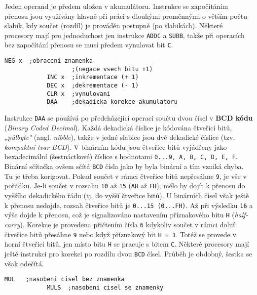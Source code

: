          Jeden operand je předem uložen v akumulátoru. Instrukce se započítáním přenosu jsou 
          využívány hlavně při práci s dlouhými proměnnými o větším počtu slabik, kdy součet 
          (rozdíl) je prováděn postupně (po slabikách). Některé procesory mají pro jednoduchost jen 
          instrukce \texttt{ADDC} a \texttt{SUBB}, takže při operacích bez započítání přenosu se 
          musí předem vynulovat bit \texttt{C}.
         
          \begin{lstlisting}[gobble=10]
            NEG x  ;obraceni znamenka 
                   ;(negace vsech bitu +1)
            INC x  ;inkrementace (+ 1)
            DEC x  ;dekrementace (- 1)
            CLR x  ;vynulovani
            DAA    ;dekadicka korekce akumulatoru
          \end{lstlisting}
         
          Instrukce \texttt{DAA} se používá po předcházející operaci součtu dvou čísel v 
          \textbf{BCD kódu} (\emph{Binary Coded Decimal}). Každá dekadická číslice je kódována 
          čtveřicí bitů, \emph{„půlbyte"} (angl. \emph{nibble}), takže v jedné slabice jsou dvě 
          dekadické číslice (tzv. \emph{kompaktní tvar BCD}). V binárním kódu jsou čtveřice bitů 
          vyjádřeny jako hexadecimální (šestnáctkové) číslice s hodnotami \texttt{0...9, A, B, C, 
          D, E, F}. Binární sčítačka ovšem sčítá \texttt{BCD} čísla jako by byla binární a tím 
          vzniká chyba. Tu je třeba korigovat. Pokud součet v rámci čtveřice bitů nepřesáhne 
          \texttt{9}, je vše v pořádku. Je-li součet v rozsahu \texttt{10} až \texttt{15} 
          (\texttt{AH} až \texttt{FH}), mělo by dojít k přenosu do vyššího dekadického řádu (tj. do 
          vyšší čtveřice bitů). U binárních čísel však ještě k přenosu nedojde, rozsah čtveřice 
          bitů je \texttt{0...15 (0...FH)}. Až při výsledku \texttt{16} a výše dojde k přenosu, což 
          je signalizováno nastavením příznakového bitu \texttt{H} (\emph{half-carry}). Korekce je 
          provedena přičtením čísla \texttt{6} kdykoliv součet v rámci dolní čtveřice bitů přesáhne 
          \texttt{9} nebo když příznakový bit  \texttt{H = 1}. Totéž se provede v horní čtveřici 
          bitů, jen místo bitu \texttt{H} se pracuje s bitem \texttt{C}. Některé procesory mají 
          ještě instrukci pro korekci po rozdílu dvou \texttt{BCD} čísel. Průběh je obdobný, šestka 
          se však odečítá.
         
          \begin{lstlisting}[gobble=10]
            MUL   ;nasobeni cisel bez znamenka
            MULS  ;nasobeni cisel se znamenky
          \end{lstlisting}
           
